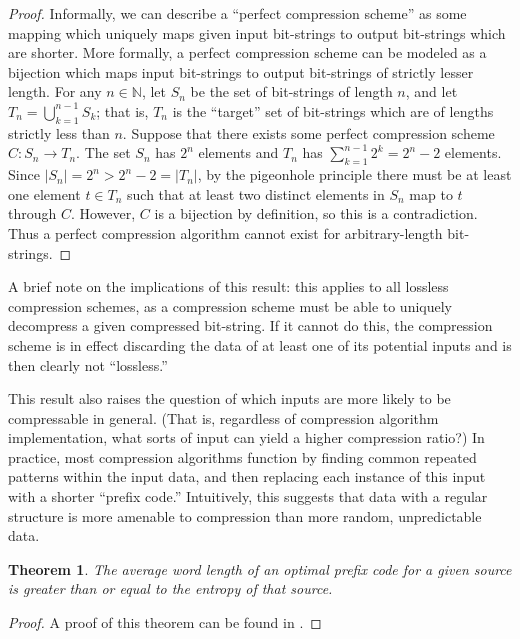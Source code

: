 \documentclass[12pt]{article}
\newtheorem{thm}{Theorem}[section]
\begin{document}
\begin{proof}
  Informally, we can describe a ``perfect compression scheme'' as some
  mapping which uniquely maps given input bit-strings to output
  bit-strings which are shorter. More formally, a perfect compression
  scheme can be modeled as a bijection which maps input bit-strings to
  output bit-strings of strictly lesser length. For any
  $n \in \mathbb{N}$, let $S_n$ be the set of bit-strings of length
  $n$, and let $T_n = \bigcup_{k = 1}^{n - 1} S_k$; that is, $T_n$ is
  the ``target'' set of bit-strings which are of lengths strictly less
  than $n$. Suppose that there exists some perfect compression scheme
  $C:S_n \to T_n$. The set $S_n$ has $2^n$ elements and $T_n$ has
  $\sum_{k=1}^{n-1}2^k = 2^n - 2$ elements. Since
  $|S_n| = 2^n > 2^n - 2 = |T_n|$, by the pigeonhole principle there
  must be at least one element $t \in T_n$ such that at least two
  distinct elements in $S_n$ map to $t$ through $C$. However, $C$ is a
  bijection by definition, so this is a contradiction. Thus a perfect
  compression algorithm cannot exist for arbitrary-length bit-strings.
\end{proof}

A brief note on the implications of this result: this applies to all
lossless compression schemes, as a compression scheme must be able to
uniquely decompress a given compressed bit-string. If it cannot do
this, the compression scheme is in effect discarding the data of at
least one of its potential inputs and is then clearly not
``lossless.''

This result also raises the question of which inputs are more likely
to be compressable in general.  (That is, regardless of compression
algorithm implementation, what sorts of input can yield a higher
compression ratio?) In practice, most compression algorithms function
by finding common repeated patterns within the input data, and then
replacing each instance of this input with a shorter ``prefix code.''
Intuitively, this suggests that data with a regular structure is more
amenable to compression than more random, unpredictable data.

\begin{thm}
  The average word length of an optimal prefix code for a given source
  is greater than or equal to the entropy of that source.
\end{thm}

\begin{proof}
  A proof of this theorem can be found in \cite{Shannon}.
\end{proof}
\end{document}
